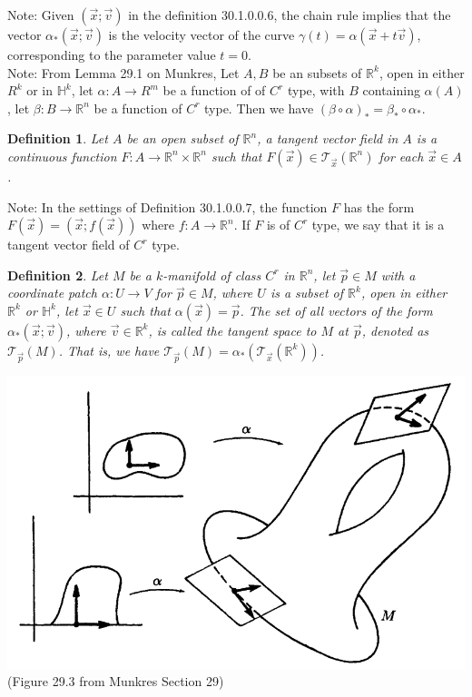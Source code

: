 \documentclass[11pt,oneside]{book}
\theoremstyle{break}
\theoremstyle{break}
\newtheorem{defn}{Definition}[corL]
\newcommand{\R}{\mathbb{R}}
\newcommand{\T}{\mathcal{T}}
\newcommand{\note}{\color{red}Note: \color{black}}
\begin{document}
\note Given $(\vec{x}; \vec{v})$ in the definition 30.1.0.0.6, the chain rule implies that the vector $\alpha_*(\vec{x};\vec{v})$ is the velocity vector of the curve $\gamma(t) = \alpha(\vec{x}+t\vec{v})$, corresponding to the parameter value $t = 0$.\\

\note From Lemma 29.1 on Munkres, Let $A,B$ be an subsets of $\R^k$, open in either $R^k$ or in $\mathbb{H}^k$, let $\alpha :A \to R^m$ be a function of of $C^r$ type, with $B$ containing $\alpha(A)$, let $\beta:B \to \R^n$ be a function of $C^r$ type. Then we have $(\beta\circ \alpha)_* = \beta_* \circ \alpha_*$.\\

\begin{defn}
Let $A$ be an open subset of $\R^n$, a tangent vector field in $A$ is a continuous function $F:A \to \R^n \times \R^n$ such that $F(\vec{x}) \in \T_{\vec{x}}(\R^n)$ for each $\vec{x}\in A$. 
\end{defn}

\note In the settings of Definition 30.1.0.0.7, the function $F$ has the form $F(\vec{x}) = (\vec{x};f(\vec{x}))$ where $f :A \to \R^n$. If $F$ is of $C^r$ type, we say that it is a tangent vector field of $C^r$ type. 

\begin{defn}
Let $M$ be a $k$-manifold of class $C^r$ in $\R^n$, let $\vec{p}\in M$ with a coordinate patch $\alpha: U \to V$ for $\vec{p} \in M$, where $U$ is a subset of $\R^k$, open in either $\R^k$ or $\mathbb{H}^k$, let $\vec{x}\in U$ such that $\alpha(\vec{x})  = \vec{p}$. The set of all vectors of the form $\alpha_*(\vec{x}; \vec{v})$, where $\vec{v}\in \R^k$, is called the tangent space to $M$ at $\vec{p}$, denoted as $\T_{\vec{p}}(M)$. That is, we have $\T_{\vec{p}}(M) = \alpha_*(\T_{\vec{x}}(\R^k))$. 
\end{defn}

\begin{center}
\includegraphics[scale=0.45]{mtangent.png}\\
(Figure 29.3 from Munkres Section 29)
\end{center}
\end{document}
